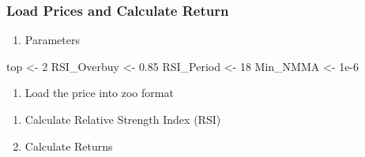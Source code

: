 \documentclass[
]{article}
\newenvironment{Shaded}{\begin{snugshade}}{\end{snugshade}}
\newcommand{\CommentTok}[1]{\textcolor[rgb]{0.56,0.35,0.01}{\textit{#1}}}
\newcommand{\DataTypeTok}[1]{\textcolor[rgb]{0.13,0.29,0.53}{#1}}
\newcommand{\DecValTok}[1]{\textcolor[rgb]{0.00,0.00,0.81}{#1}}
\newcommand{\FloatTok}[1]{\textcolor[rgb]{0.00,0.00,0.81}{#1}}
\newcommand{\KeywordTok}[1]{\textcolor[rgb]{0.13,0.29,0.53}{\textbf{#1}}}
\newcommand{\NormalTok}[1]{#1}
\newcommand{\OtherTok}[1]{\textcolor[rgb]{0.56,0.35,0.01}{#1}}
\newcommand{\StringTok}[1]{\textcolor[rgb]{0.31,0.60,0.02}{#1}}
\providecommand{\tightlist}{%
  \setlength{\itemsep}{0pt}\setlength{\parskip}{0pt}}
\begin{document}
\hypertarget{load-prices-and-calculate-return}{%
\subsubsection{Load Prices and Calculate
Return}\label{load-prices-and-calculate-return}}

\begin{enumerate}
\def\labelenumi{\arabic{enumi}.}
\setcounter{enumi}{-1}
\tightlist
\item
  Parameters
\end{enumerate}

\begin{Shaded}
\begin{Highlighting}[]
\NormalTok{top <-}\StringTok{ }\DecValTok{2}
\NormalTok{RSI_Overbuy <-}\StringTok{ }\FloatTok{0.85}
\NormalTok{RSI_Period <-}\StringTok{ }\DecValTok{18} 
\NormalTok{Min_NMMA <-}\StringTok{ }\FloatTok{1e-6}
\end{Highlighting}
\end{Shaded}

\begin{enumerate}
\def\labelenumi{\arabic{enumi}.}
\tightlist
\item
  Load the price into zoo format
\end{enumerate}

\begin{Shaded}
\end{Shaded}

\begin{enumerate}
\def\labelenumi{\arabic{enumi}.}
\setcounter{enumi}{1}
\item
  Calculate Relative Strength Index (RSI)
\item
  Calculate Returns
\end{enumerate}
\end{document}
